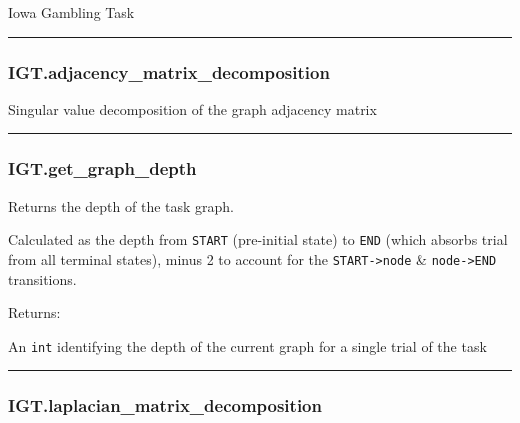 Iowa Gambling Task

\begin{center}\rule{0.5\linewidth}{\linethickness}\end{center}

\subsubsection{IGT.adjacency\_matrix\_decomposition}\label{igt.adjacency_matrix_decomposition}

\begin{Shaded}
\begin{Highlighting}[]
\NormalTok{)}
\end{Highlighting}
\end{Shaded}

Singular value decomposition of the graph adjacency matrix

\begin{center}\rule{0.5\linewidth}{\linethickness}\end{center}

\subsubsection{IGT.get\_graph\_depth}\label{igt.get_graph_depth}

\begin{Shaded}
\begin{Highlighting}[]
\NormalTok{)}
\end{Highlighting}
\end{Shaded}

Returns the depth of the task graph.

Calculated as the depth from \texttt{START} (pre-initial state) to
\texttt{END} (which absorbs trial from all terminal states), minus 2 to
account for the \texttt{START-\textgreater{}node} \&
\texttt{node-\textgreater{}END} transitions.

Returns:

An \texttt{int} identifying the depth of the current graph for a single
trial of the task

\begin{center}\rule{0.5\linewidth}{\linethickness}\end{center}

\subsubsection{IGT.laplacian\_matrix\_decomposition}\label{igt.laplacian_matrix_decomposition}

